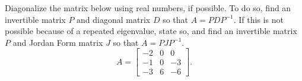 \documentclass{ximera}
\begin{document}
\begin{exercise}
    Diagonalize the matrix below using real numbers, if possible. To do so, find an invertible matrix $P$ and diagonal matrix $D$ so that $A = PDP^{-1}$. If this is not possible because of a repeated eigenvalue, state so, and find an invertible matrix $P$ and Jordan Form matrix $J$ so that $A = PJP^{-1}$. 
    \[ 
        A = 
        \begin{bmatrix} 
            -2 &0 & 0\\
            -1 & 0 &-3\\ 
            -3 &  6 & -6 
        \end{bmatrix}.
    \]
    \begin{multipleChoice}
    \end{multipleChoice}
\end{exercise} 
\end{document}
